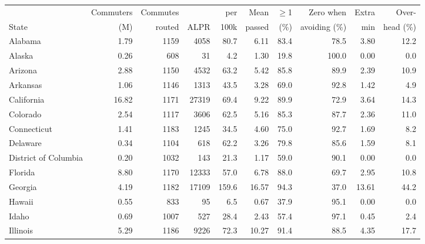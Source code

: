\begin{tabular}{lrrrrrrrrr}
\toprule
& Commuters & Commutes & & per & Mean & $\geq$1 & Zero when & Extra & Over- \\
State & (M) & routed & ALPR & 100k & passed & (\%) & avoiding (\%) & min & head (\%) \\
\midrule
Alabama & \num{1.79} & \num{1159} & \num{4058} & \num{80.7} & \num{6.11} & \num{83.4} & \num{78.5} & \num{3.80} & \num{12.2} \\
Alaska & \num{0.26} & \num{608} & \num{31} & \num{4.2} & \num{1.30} & \num{19.8} & \num{100.0} & \num{0.00} & \num{0.0} \\
Arizona & \num{2.88} & \num{1150} & \num{4532} & \num{63.2} & \num{5.42} & \num{85.8} & \num{89.9} & \num{2.39} & \num{10.9} \\
Arkansas & \num{1.06} & \num{1146} & \num{1313} & \num{43.5} & \num{3.28} & \num{69.0} & \num{92.8} & \num{1.42} & \num{4.9} \\
California & \num{16.82} & \num{1171} & \num{27319} & \num{69.4} & \num{9.22} & \num{89.9} & \num{72.9} & \num{3.64} & \num{14.3} \\
Colorado & \num{2.54} & \num{1117} & \num{3606} & \num{62.5} & \num{5.16} & \num{85.3} & \num{87.7} & \num{2.36} & \num{11.0} \\
Connecticut & \num{1.41} & \num{1183} & \num{1245} & \num{34.5} & \num{4.60} & \num{75.0} & \num{92.7} & \num{1.69} & \num{8.2} \\
Delaware & \num{0.34} & \num{1104} & \num{618} & \num{62.2} & \num{3.26} & \num{79.8} & \num{85.6} & \num{1.59} & \num{8.1} \\
District of Columbia & \num{0.20} & \num{1032} & \num{143} & \num{21.3} & \num{1.17} & \num{59.0} & \num{90.1} & \num{0.00} & \num{0.0} \\
Florida & \num{8.80} & \num{1170} & \num{12333} & \num{57.0} & \num{6.78} & \num{88.0} & \num{69.7} & \num{2.95} & \num{10.8} \\
Georgia & \num{4.19} & \num{1182} & \num{17109} & \num{159.6} & \num{16.57} & \num{94.3} & \num{37.0} & \num{13.61} & \num{44.2} \\
Hawaii & \num{0.55} & \num{833} & \num{95} & \num{6.5} & \num{0.67} & \num{37.9} & \num{95.1} & \num{0.00} & \num{0.0} \\
Idaho & \num{0.69} & \num{1007} & \num{527} & \num{28.4} & \num{2.43} & \num{57.4} & \num{97.1} & \num{0.45} & \num{2.4} \\
Illinois & \num{5.29} & \num{1186} & \num{9226} & \num{72.3} & \num{10.27} & \num{91.4} & \num{88.5} & \num{4.35} & \num{17.7} \\

\end{tabular}
